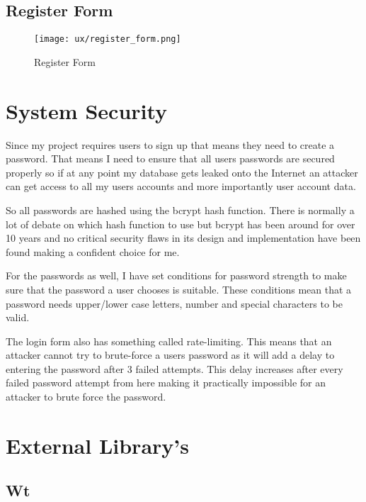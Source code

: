 \subsection{Register Form}

\begin{figure}[H]
\hspace{-2cm}
\begin{center}
\texttt{[image: ux/register\_form.png]}
\end{center} 
\caption{Register Form}
\label{ux_register_form}
\end{figure}


\section{System Security}

Since my project requires users to sign up that means they need to create a password. That means I need to ensure that all users passwords are secured properly so if at any point my database gets leaked onto the Internet an attacker can get access to all my users accounts and more importantly user account data. 

So all passwords are hashed using the bcrypt hash function. There is normally a lot of debate on which hash function to use but bcrypt has been around for over 10 years and no critical security flaws in its design and implementation have been found making a confident choice for me.

For the passwords as well, I have set conditions for password strength to make sure that the password a user chooses is suitable. These conditions mean that a password needs upper/lower case letters, number and special characters to be valid.

The login form also has something called rate-limiting. This means that an attacker cannot try to brute-force a users password as it will add a delay to entering the password after 3 failed attempts. This delay increases after every failed password attempt from here making it practically impossible for an attacker to brute force the password.

\section{External Library's}
\subsection{Wt}

